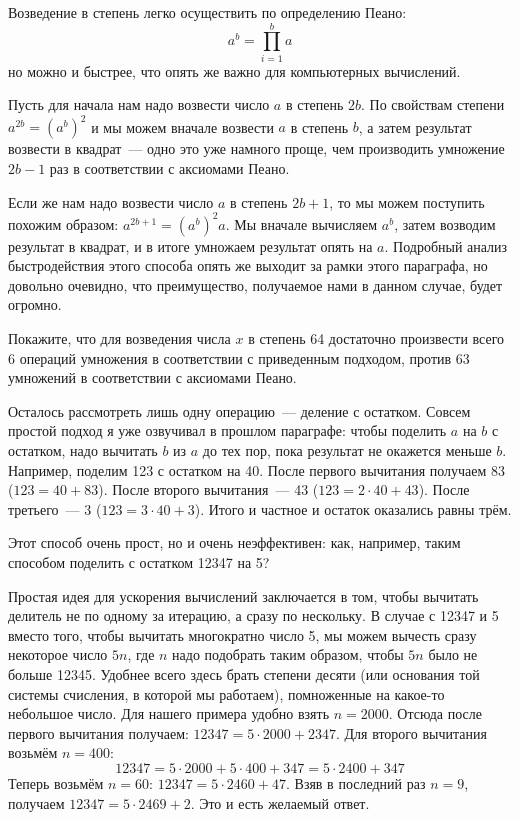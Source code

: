 Возведение в степень легко осуществить по определению Пеано:
$$a^b = \prod_{i=1}^b a$$
но можно и быстрее, что опять же важно для компьютерных вычислений.

Пусть для начала нам надо возвести число $a$ в степень $2b$. По свойствам степени $a^{2b} = (a^b)^2$ и мы можем вначале возвести $a$ в степень $b$, а затем результат возвести в квадрат~— одно это уже намного проще, чем производить умножение $2b - 1$ раз в соответствии с аксиомами Пеано.

Если же нам надо возвести число $a$ в степень $2b +1$, то мы можем поступить похожим образом: $a^{2b+1} = (a^b)^2a$. Мы вначале вычисляем $a^b$, затем возводим результат в квадрат, и в итоге умножаем результат опять на $a$. Подробный анализ быстродействия этого способа опять же выходит за рамки этого параграфа, но довольно очевидно, что преимущество, получаемое нами в данном случае, будет огромно.
\begin{exercise}
Покажите, что для возведения числа $x$ в степень 64 достаточно произвести всего 6 операций умножения в соответствии с приведенным подходом, против 63 умножений в соответствии с аксиомами Пеано.
\end{exercise}

Осталось рассмотреть лишь одну операцию~— деление с остатком. Совсем простой подход я уже озвучивал в прошлом параграфе: чтобы поделить $a$ на $b$ с остатком, надо вычитать $b$ из $a$ до тех пор, пока результат не окажется меньше $b$. Например, поделим 123 с остатком на 40. После первого вычитания получаем 83 ($123 = 40 + 83$). После второго вычитания~— 43 ($123 = 2\cdot 40 + 43$). После третьего~— 3 ($123 = 3\cdot 40 + 3$). Итого и частное и остаток оказались равны трём.

Этот способ очень прост, но и очень неэффективен: как, например, таким способом поделить с остатком 12347 на 5?

Простая идея для ускорения вычислений заключается в том, чтобы вычитать делитель не по одному за итерацию, а сразу по нескольку. В случае с 12347 и 5 вместо того, чтобы вычитать многократно число 5, мы можем вычесть сразу некоторое число $5n$, где $n$ надо подобрать таким образом, чтобы $5n$ было не больше 12345. Удобнее всего здесь брать степени десяти (или основания той системы счисления, в которой мы работаем), помноженные на какое-то небольшое число. Для нашего примера удобно взять $n=2000$. Отсюда после первого вычитания получаем: $12347 = 5\cdot 2000 + 2347$. Для второго вычитания возьмём $n=400$:
$$12347 = 5\cdot 2000 + 5\cdot 400 + 347 = 5\cdot 2400 + 347$$
Теперь возьмём $n=60$: $12347 = 5\cdot 2460 + 47$. Взяв в последний раз $n=9$, получаем $12347 = 5\cdot 2469 + 2$. Это и есть желаемый ответ.

